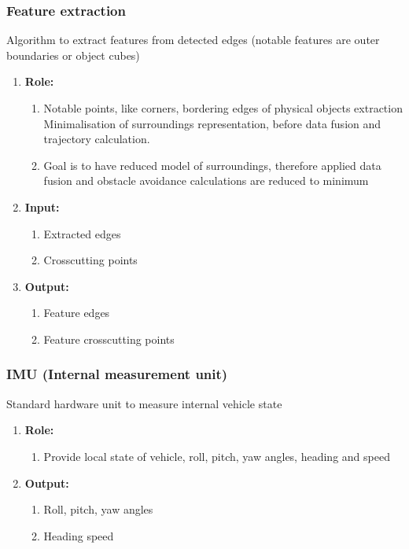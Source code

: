 \subsubsection{Feature extraction}
Algorithm to extract features from detected edges (notable features are outer boundaries or object cubes)
	\begin{enumerate}[]
	\item \textbf{Role:}
		\begin{enumerate}[]
		\item Notable points, like corners, bordering edges of physical objects extraction
		Minimalisation of surroundings representation, before data fusion and trajectory calculation. 
		\item Goal is to have reduced model of surroundings, therefore applied data fusion and obstacle avoidance calculations are reduced to minimum
		\end{enumerate}
	\item \textbf{Input:}
		\begin{enumerate}[1.]
		\item Extracted edges
		\item Crosscutting points
		\end{enumerate}
	\item \textbf{Output:}
		\begin{enumerate}[1.]
		\item Feature edges
		\item Feature crosscutting points
		\end{enumerate}
	\end{enumerate}
	
\subsubsection{IMU (Internal measurement unit)}
	Standard hardware unit to measure internal vehicle state
	\begin{enumerate}[]
	\item \textbf{Role:}
		\begin{enumerate}[]
		\item Provide local state of vehicle, roll, pitch, yaw angles, heading and speed
		\end{enumerate}
	\item \textbf{Output:}
		\begin{enumerate}[1.]
		\item Roll, pitch, yaw angles 
		\item Heading speed
		\end{enumerate}
	\end{enumerate}
	
